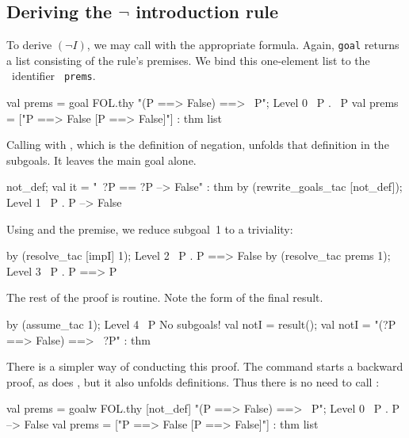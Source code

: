 \subsection{Deriving the $\neg$ introduction rule}
To derive $(\neg I)$, we may call  with the appropriate
formula.  Again, {\tt goal} returns a list consisting of the rule's
premises.  We bind this one-element list to the \ML\ identifier {\tt
  prems}.
\begin{ttbox}
val prems = goal FOL.thy "(P ==> False) ==> ~P";
{\out Level 0}
{\out ~P}
{. ~P}
{\out val prems = ["P ==> False  [P ==> False]"] : thm list}
\end{ttbox}
Calling  with , which is the
definition of negation, unfolds that definition in the subgoals.  It leaves
the main goal alone.
\begin{ttbox}
not_def;
{\out val it = "~?P == ?P --> False" : thm}
by (rewrite_goals_tac [not_def]);
{\out Level 1}
{\out ~P}
{. P --> False}
\end{ttbox}
Using  and the premise, we reduce subgoal~1 to a triviality:
\begin{ttbox}
by (resolve_tac [impI] 1);
{\out Level 2}
{\out ~P}
{. P ==> False}
\ttbreak
by (resolve_tac prems 1);
{\out Level 3}
{\out ~P}
{. P ==> P}
\end{ttbox}
The rest of the proof is routine.  Note the form of the final result.
\begin{ttbox}
by (assume_tac 1);
{\out Level 4}
{\out ~P}
{\out No subgoals!}
\ttbreak
val notI = result();
{\out val notI = "(?P ==> False) ==> ~?P" : thm}
\end{ttbox}

There is a simpler way of conducting this proof.  The 
command starts a backward proof, as does , but it also
unfolds definitions.  Thus there is no need to call
:
\begin{ttbox}
val prems = goalw FOL.thy [not_def]
    "(P ==> False) ==> ~P";
{\out Level 0}
{\out ~P}
{. P --> False}
{\out val prems = ["P ==> False  [P ==> False]"] : thm list}
\end{ttbox}



